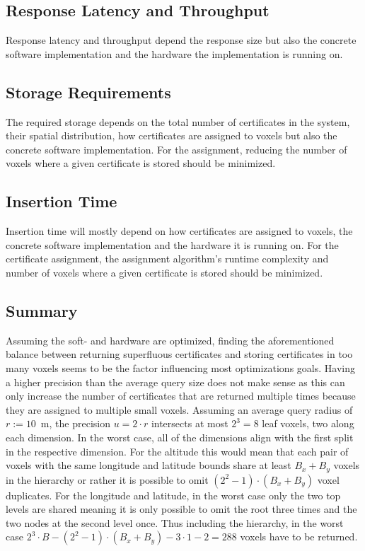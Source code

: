 \documentclass[10pt,conference,compsocconf]{IEEEtran}
\begin{document}
\subsection{Response Latency and Throughput}
Response latency and throughput depend the response size but also the concrete software implementation and the hardware the implementation is running on.

\subsection{Storage Requirements}
The required storage depends on the total number of certificates in the system, their spatial distribution, how certificates are assigned to voxels but also the concrete software implementation.
For the assignment, reducing the number of voxels where a given certificate is stored should be minimized.

\subsection{Insertion Time}
Insertion time will mostly depend on how certificates are assigned to voxels, the concrete software implementation and the hardware it is running on.
For the certificate assignment, the assignment algorithm's runtime complexity and number of voxels where a given certificate is stored should be minimized.

\subsection{Summary}
Assuming the soft- and hardware are optimized, finding the aforementioned balance between returning superfluous certificates and storing certificates in too many voxels seems to be the factor influencing most optimizations goals.
Having a higher precision than the average query size does not make sense as this can only increase the number of certificates that are returned multiple times because they are assigned to multiple small voxels.
Assuming an average query radius of $r := 10$~m, the precision $u = 2 \cdot r$ intersects at most $2^3 = 8$ leaf voxels, two along each dimension.
In the worst case, all of the dimensions align with the first split in the respective dimension.
For the altitude this would mean that each pair of voxels with the same longitude and latitude bounds share at least $B_x + B_y$ voxels in the hierarchy or rather it is possible to omit $(2^2 - 1) \cdot (B_x + B_y)$ voxel duplicates.
For the longitude and latitude, in the worst case only the two top levels are shared meaning it is only possible to omit the root three times and the two nodes at the second level once.
Thus including the hierarchy, in the worst case $2^3 \cdot B - (2^2 - 1) \cdot (B_x + B_y) - 3 \cdot 1 - 2 = 288$ voxels have to be returned.
\end{document}

